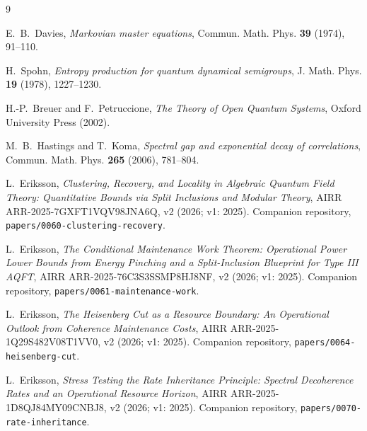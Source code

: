 \documentclass[11pt,a4paper]{article}
\theoremstyle{plain}
\theoremstyle{definition}
\theoremstyle{remark}
\begin{document}
\begin{thebibliography}{9}\small

 E.~B.~Davies, \emph{Markovian master equations}, Commun.
Math. Phys. \textbf{39} (1974), 91--110.

 H.~Spohn, \emph{Entropy production for quantum dynamical
semigroups}, J. Math. Phys. \textbf{19} (1978), 1227--1230.

 H.-P.~Breuer and F.~Petruccione, \emph{The Theory
of Open Quantum Systems}, Oxford University Press (2002).

 M.~B.~Hastings and T.~Koma, \emph{Spectral gap and
exponential decay of correlations}, Commun. Math. Phys. \textbf{265} (2006),
781--804.

 L.~Eriksson, \emph{Clustering, Recovery, and Locality in
Algebraic Quantum Field Theory: Quantitative Bounds via Split Inclusions and
Modular Theory}, AIRR ARR-2025-7GXFT1VQV98JNA6Q, v2 (2026; v1: 2025). Companion
repository, \texttt{papers/0060-clustering-recovery}.

 L.~Eriksson, \emph{The Conditional Maintenance Work
Theorem: Operational Power Lower Bounds from Energy Pinching and a
Split-Inclusion Blueprint for Type III AQFT}, AIRR ARR-2025-76C3S3SSMP8HJ8NF, v2 (2026;
v1: 2025). Companion repository, \texttt{papers/0061-maintenance-work}.

 L.~Eriksson, \emph{The Heisenberg Cut as a Resource Boundary:
An Operational Outlook from Coherence Maintenance Costs}, AIRR ARR-2025-1Q29S482V08T1VV0,
v2 (2026; v1: 2025). Companion repository,
\texttt{papers/0064-heisenberg-cut}.

 L.~Eriksson, \emph{Stress Testing the Rate Inheritance
Principle: Spectral Decoherence Rates and an Operational Resource Horizon},
AIRR ARR-2025-1D8QJ84MY09CNBJ8, v2 (2026; v1: 2025). Companion repository,
\texttt{papers/0070-rate-inheritance}.

\end{thebibliography}
\end{document}
